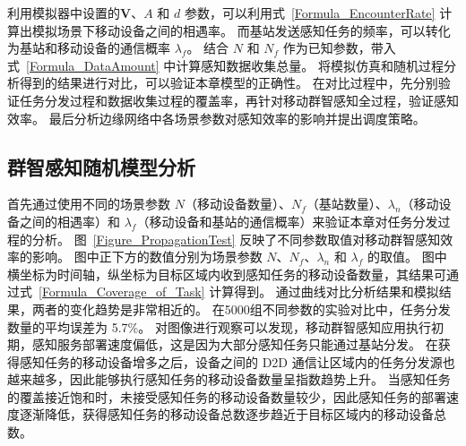 利用模拟器中设置的$\boldsymbol{V}$、$A$ 和 $d$ 参数，可以利用式~\eqref{Formula_EncounterRate} 计算出模拟场景下移动设备之间的相遇率。
而基站发送感知任务的频率，可以转化为基站和移动设备的通信概率 $\lambda_f$。
结合 $N$ 和 $N_f$ 作为已知参数，带入式~\eqref{Formula_DataAmount} 中计算感知数据收集总量。
将模拟仿真和随机过程分析得到的结果进行对比，可以验证本章模型的正确性。
在对比过程中，先分别验证任务分发过程和数据收集过程的覆盖率，再针对移动群智感知全过程，验证感知效率。
最后分析边缘网络中各场景参数对感知效率的影响并提出调度策略。


\subsection{群智感知随机模型分析}

首先通过使用不同的场景参数 $N$（移动设备数量）、$N_f$（基站数量）、$\lambda_n$（移动设备之间的相遇率）和 $\lambda_f$（移动设备和基站的通信概率）来验证本章对任务分发过程的分析。
图~\ref{Figure_PropagationTest} 反映了不同参数取值对移动群智感知效率的影响。
图中正下方的数值分别为场景参数 $N$、$N_f$、$\lambda_n$ 和 $\lambda_f$ 的取值。
图中横坐标为时间轴，纵坐标为目标区域内收到感知任务的移动设备数量，其结果可通过式~\eqref{Formula_Coverage_of_Task} 计算得到。
通过曲线对比分析结果和模拟结果，两者的变化趋势是非常相近的。
在5000组不同参数的实验对比中，任务分发数量的平均误差为 5.7\%。
对图像进行观察可以发现，移动群智感知应用执行初期，感知服务部署速度偏低，这是因为大部分感知任务只能通过基站分发。
在获得感知任务的移动设备增多之后，设备之间的 D2D 通信让区域内的任务分发源也越来越多，因此能够执行感知任务的移动设备数量呈指数趋势上升。
当感知任务的覆盖接近饱和时，未接受感知任务的移动设备数量较少，因此感知任务的部署速度逐渐降低，获得感知任务的移动设备总数逐步趋近于目标区域内的移动设备总数。


